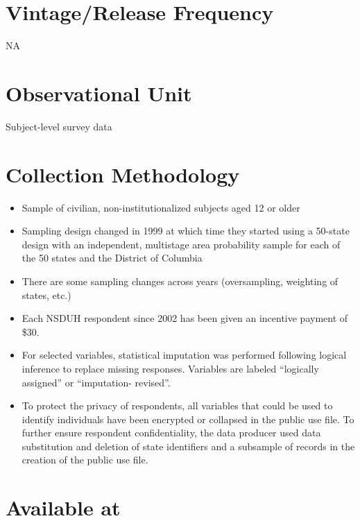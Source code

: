 \documentclass[
]{book}
\providecommand{\tightlist}{%
  \setlength{\itemsep}{0pt}\setlength{\parskip}{0pt}}
\begin{document}
\hypertarget{vintagerelease-frequency-64}{%
\section{Vintage/Release Frequency}\label{vintagerelease-frequency-64}}

NA

\hypertarget{observational-unit-64}{%
\section{Observational Unit}\label{observational-unit-64}}

Subject-level survey data

\hypertarget{collection-methodology-64}{%
\section{Collection Methodology}\label{collection-methodology-64}}

\begin{itemize}
\tightlist
\item
  Sample of civilian, non-institutionalized subjects aged 12 or older
\item
  Sampling design changed in 1999 at which time they started using a 50-state design with an independent, multistage area probability sample for each of the 50 states and the District of Columbia
\item
  There are some sampling changes across years (oversampling, weighting of states, etc.)
\item
  Each NSDUH respondent since 2002 has been given an incentive payment of \$30.
\item
  For selected variables, statistical imputation was performed following logical inference to replace missing responses. Variables are labeled ``logically assigned'' or ``imputation- revised''.
\item
  To protect the privacy of respondents, all variables that could be used to identify individuals have been encrypted or collapsed in the public use file. To further ensure respondent confidentiality, the data producer used data substitution and deletion of state identifiers and a subsample of records in the creation of the public use file.
\end{itemize}

\hypertarget{available-at-64}{%
\section{Available at}\label{available-at-64}}
\end{document}
